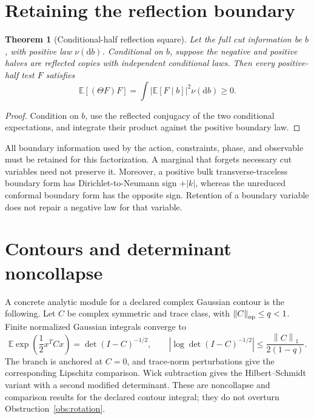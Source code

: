 \documentclass[11pt,a4paper,oneside]{book}
\theoremstyle{plain}
\newtheorem{theorem}{Theorem}[chapter]
\theoremstyle{definition}
\theoremstyle{remark}
\newcommand{\E}{\mathbb E}
\newcommand{\dd}{\mathrm d}
\newcommand{\norm}[1]{\left\lVert#1\right\rVert}
\newcommand{\abs}[1]{\left\lvert#1\right\rvert}
\newcommand{\src}[2]{\cite{#1}}
\begin{document}
\section{Retaining the reflection boundary}
\begin{theorem}[Conditional-half reflection square]
\label{thm:half-square}
Let the full cut information be $b$, with positive law $\nu(\dd b)$. Conditional on $b$, suppose the negative and positive halves are reflected copies with independent conditional laws. Then every positive-half test $F$ satisfies
\begin{equation}
 \E[(\Theta F)F]
 =\int\left|\E[F\mid b]\right|^2\nu(\dd b)\ge0.
 \label{eq:half-square}
\end{equation}
\end{theorem}
\begin{proof}
Condition on $b$, use the reflected conjugacy of the two conditional expectations, and integrate their product against the positive boundary law.
\end{proof}
\cite{R10,R14}
All boundary information used by the action, constraints, phase, and observable must be retained for this factorization. A marginal that forgets necessary cut variables need not preserve it. Moreover, a positive bulk transverse-traceless boundary form has Dirichlet-to-Neumann sign $+|k|$, whereas the unreduced conformal boundary form has the opposite sign. Retention of a boundary variable does not repair a negative law for that variable. \src{R9}{thm:n9v97-Einstein-boundary-symbol}

\section{Contours and determinant noncollapse}
A concrete analytic module for a declared complex Gaussian contour is the following. Let $C$ be complex symmetric and trace class, with $\norm{C}_{\rm op}\le q<1$. Finite normalized Gaussian integrals converge to
\begin{equation}
 \E\exp\!\left(\frac12x^TCx\right)=\det(I-C)^{-1/2},
 \qquad
 \abs{\log\det(I-C)^{-1/2}}
 \le\frac{\norm{C}_1}{2(1-q)}.
 \label{eq:complex-det}
\end{equation}
The branch is anchored at $C=0$, and trace-norm perturbations give the corresponding Lipschitz comparison. Wick subtraction gives the Hilbert--Schmidt variant with a second modified determinant. These are noncollapse and comparison results for the declared contour integral; they do not overturn Obstruction~\ref{obs:rotation}. \cite{R11,R12}
\end{document}
